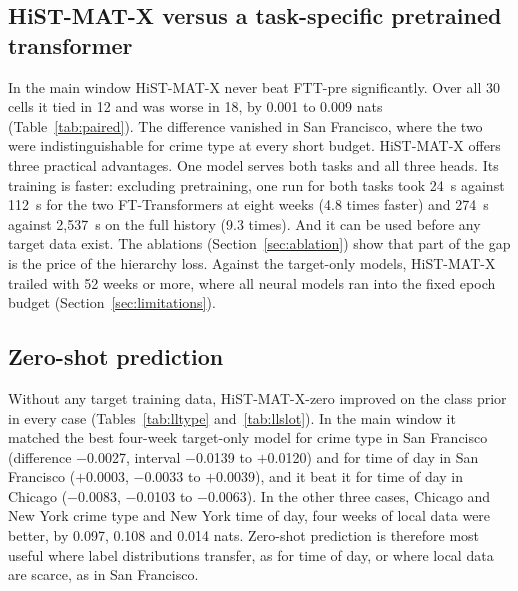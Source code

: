 \documentclass[11pt]{article}
\newcommand{\HMX}{HiST-MAT-X}
\begin{document}
\subsection{\HMX{} versus a task-specific pretrained transformer}
In the main window \HMX{} never beat FTT-pre significantly. Over all 30 cells it tied in 12 and was worse in 18, by 0.001 to 0.009 nats (Table~\ref{tab:paired}). The difference vanished in San Francisco, where the two were indistinguishable for crime type at every short budget. \HMX{} offers three practical advantages. One model serves both tasks and all three heads. Its training is faster: excluding pretraining, one run for both tasks took 24~s against 112~s for the two FT-Transformers at eight weeks (4.8 times faster) and 274~s against 2,537~s on the full history (9.3 times). And it can be used before any target data exist. The ablations (Section~\ref{sec:ablation}) show that part of the gap is the price of the hierarchy loss. Against the target-only models, \HMX{} trailed with 52 weeks or more, where all neural models ran into the fixed epoch budget (Section~\ref{sec:limitations}).

\subsection{Zero-shot prediction}
Without any target training data, \HMX{}-zero improved on the class prior in every case (Tables~\ref{tab:lltype} and~\ref{tab:llslot}). In the main window it matched the best four-week target-only model for crime type in San Francisco (difference $-$0.0027, interval $-$0.0139 to $+$0.0120) and for time of day in San Francisco ($+$0.0003, $-$0.0033 to $+$0.0039), and it beat it for time of day in Chicago ($-$0.0083, $-$0.0103 to $-$0.0063). In the other three cases, Chicago and New York crime type and New York time of day, four weeks of local data were better, by 0.097, 0.108 and 0.014 nats. Zero-shot prediction is therefore most useful where label distributions transfer, as for time of day, or where local data are scarce, as in San Francisco.
\end{document}
